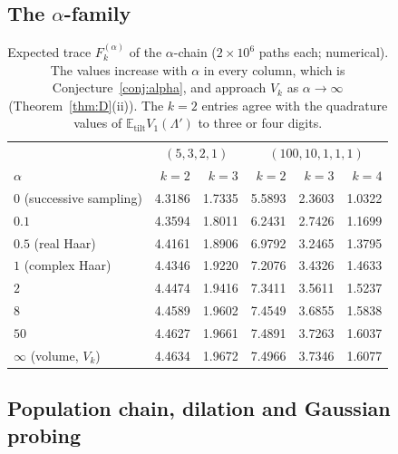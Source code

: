 \documentclass[11pt,a4paper]{article}
\theoremstyle{definition}
\newcommand{\E}{\mathbb{E}}
\newcommand{\tilt}{\mathrm{tilt}}
\begin{document}
\subsection{The $\alpha$-family}

\begin{table}[h]
\centering\small
\begin{tabular}{@{}l|rr|rrr@{}}
\toprule
& \multicolumn{2}{c|}{$(5,3,2,1)$} & \multicolumn{3}{c}{$(100,10,1,1,1)$}\\
$\alpha$ & $k=2$ & $k=3$ & $k=2$ & $k=3$ & $k=4$\\
\midrule
$0$ (successive sampling) & 4.3186 & 1.7335 & 5.5893 & 2.3603 & 1.0322\\
$0.1$ & 4.3594 & 1.8011 & 6.2431 & 2.7426 & 1.1699\\
$0.5$ (real Haar) & 4.4161 & 1.8906 & 6.9792 & 3.2465 & 1.3795\\
$1$ (complex Haar) & 4.4346 & 1.9220 & 7.2076 & 3.4326 & 1.4633\\
$2$ & 4.4474 & 1.9416 & 7.3411 & 3.5611 & 1.5237\\
$8$ & 4.4589 & 1.9602 & 7.4549 & 3.6855 & 1.5838\\
$50$ & 4.4627 & 1.9661 & 7.4891 & 3.7263 & 1.6037\\
$\infty$ (volume, $V_k$) & 4.4634 & 1.9672 & 7.4966 & 3.7346 & 1.6077\\
\bottomrule
\end{tabular}
\caption{Expected trace $F^{(\alpha)}_k$ of the $\alpha$-chain ($2\times10^6$ paths each; numerical). The values increase with $\alpha$ in every column, which is Conjecture~\ref{conj:alpha}, and approach $V_k$ as $\alpha\to\infty$ (Theorem~\ref{thm:D}(ii)). The $k=2$ entries agree with the quadrature values of $\E_\tilt V_1(\Lambda')$ to three or four digits.}
\label{tab:alpha}
\end{table}

\subsection{Population chain, dilation and Gaussian probing}
\end{document}
